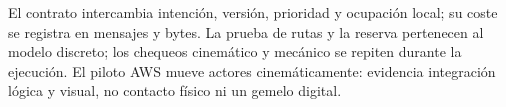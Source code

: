 El contrato intercambia intención, versión, prioridad y ocupación local; su coste
se registra en mensajes y bytes. La prueba de rutas y la reserva pertenecen al
modelo discreto; los chequeos cinemático y mecánico se repiten durante la
ejecución. El piloto AWS mueve actores cinemáticamente: evidencia integración
lógica y visual, no contacto físico ni un gemelo digital.

